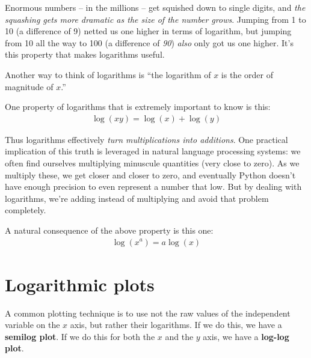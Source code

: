Enormous numbers -- in the millions -- get squished down to single digits, and
\textit{the squashing gets more dramatic as the size of the number grows}.
Jumping from 1 to 10 (a difference of 9) netted us one higher in terms of
logarithm, but jumping from 10 all the way to 100 (a difference of
\textit{90}) \textit{also} only got us one higher. It's this property that
makes logarithms useful.

Another way to think of logarithms is ``the logarithm of $x$ is the order of
magnitude of $x$.''

One property of logarithms that is extremely important to know is this:
\begin{align*}
\log(xy) = \log(x) + \log(y)
\end{align*}

Thus logarithms effectively \textit{turn multiplications into additions}. One
practical implication of this truth is leveraged in natural language
processing systems: we often find ourselves multiplying minuscule quantities
(very close to zero). As we multiply these, we get closer and closer to zero,
and eventually Python doesn't have enough precision to even represent a number
that low. But by dealing with logarithms, we're adding instead of multiplying
and avoid that problem completely.

A natural consequence of the above property is this one:
\begin{align*}
\log(x^a) = a \log(x)
\end{align*}

\section{Logarithmic plots}

A common plotting technique is to use not the raw values of the independent
variable on the $x$ axis, but rather their logarithms. If we do this, we have
a \textbf{semilog plot}. If we do this for both the $x$ and the $y$ axis, we
have a \textbf{log-log plot}.

